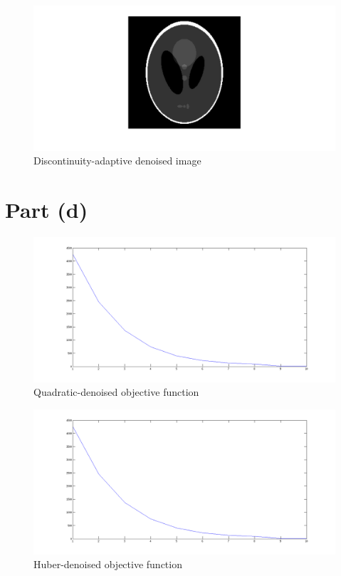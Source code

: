 \documentclass[11pt]{article}
\begin{document}
\begin{figure}[H]
\caption{Discontinuity-adaptive denoised image}
\begin{center}
\includegraphics[scale=0.5]{discDenoised}
\end{center}
\end{figure}

\section*{Part (d)}

\begin{figure}[H]
\caption{Quadratic-denoised objective function}
\begin{center}
\includegraphics[scale=0.5]{quadObj}
\end{center}
\end{figure}

\begin{figure}[H]
\caption{Huber-denoised objective function}
\begin{center}
\includegraphics[scale=0.5]{huberObj}
\end{center}
\end{figure}
\end{document}

